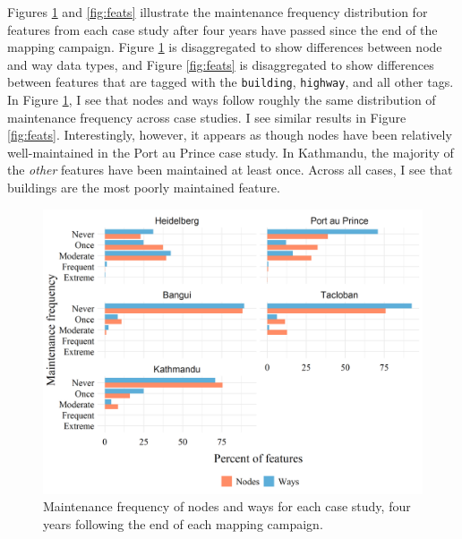 Figures \ref{fig:types} and \ref{fig:feats} illustrate the maintenance frequency distribution for features from each case study after four years have passed since the end of the mapping campaign. Figure \ref{fig:types} is disaggregated to show differences between node and way data types, and Figure \ref{fig:feats} is disaggregated to show differences between features that are tagged with the \texttt{building}, \texttt{highway}, and all other tags. In Figure \ref{fig:types}, I see that nodes and ways follow roughly the same distribution of maintenance frequency across case studies. I see similar results in Figure \ref{fig:feats}. Interestingly, however, it appears as though nodes have been relatively well-maintained in the Port au Prince case study. In Kathmandu, the majority of the \textit{other} features have been maintained at least once. Across all cases, I see that buildings are the most poorly maintained feature. 

\begin{figure} %
    \centering %
    \includegraphics[width = \textwidth]{Images/typesmaint.png} %
    \caption{Maintenance frequency of nodes and ways for each case study, four years following the end of each mapping campaign.} %
    \label{fig:types} %
\end{figure}

